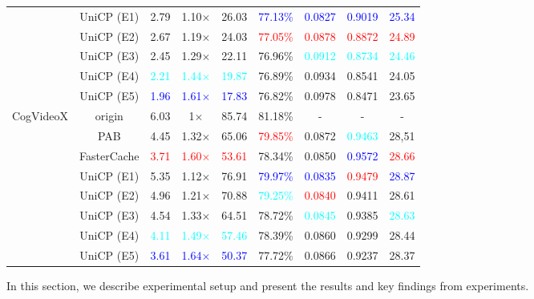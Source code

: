 \begin{table*}[ht]
\begin{tabular}{ccccccccc}
        \hline
        &UniCP (E1) & 2.79 & 1.10$\times$ & 26.03 & \textcolor{blue}{77.13\%} & \textcolor{blue}{0.0827} & \textcolor{blue}{0.9019} & \textcolor{blue}{25.34} \\
        &UniCP (E2) &2.67&1.19$\times$&24.03&\textcolor{red}{77.05\%} &\textcolor{red}{0.0878}&\textcolor{red}{0.8872}&\textcolor{red}{24.89}\\
        &UniCP (E3) &2.45&1.29$\times$&22.11&76.96\%&\textcolor{cyan}{0.0912}&\textcolor{cyan}{0.8734}&\textcolor{cyan}{24.46}\\
        &UniCP (E4) &\textcolor{cyan}{2.21}&\textcolor{cyan}{1.44$\times$}&\textcolor{cyan}{19.87}&76.89\%&0.0934&0.8541&24.05\\
        &UniCP (E5) & \textcolor{blue}{1.96} & \textcolor{blue}{1.61$\times$} & \textcolor{blue}{17.83} & 76.82\% & 0.0978 & 0.8471 & 23.65 \\
        \midrule
        \multirow{4}{*}{CogVideoX}
        & origin & 6.03 & 1$\times$ & 85.74 & 81.18\% & - & - & - \\ 
        & PAB \cite{zhao2024pab} & 4.45 & 1.32$\times$ & 65.06 & \textcolor{red}{79.85\%} & 0.0872 & \textcolor{cyan}{0.9463} & 28,51 \\
        & FasterCache \cite{lv2024fastercache} & \textcolor{red}{3.71} & \textcolor{red}{1.60$\times$} & \textcolor{red}{53.61} & 78.34\% & 0.0850 & \textcolor{blue}{0.9572} & \textcolor{red}{28.66} \\
        \hline
        &UniCP (E1) & 5.35 & 1.12$\times$ & 76.91&\textcolor{blue}{79.97\%} & \textcolor{blue}{0.0835} & \textcolor{red}{0.9479} & \textcolor{blue}{28.87} \\
        &UniCP (E2) &4.96&1.21$\times$&70.88&\textcolor{cyan}{79.25\%}&\textcolor{red}{0.0840}&0.9411&28.61\\
        &UniCP (E3) &4.54&1.33$\times$&64.51&78.72\%&\textcolor{cyan}{0.0845}&0.9385&\textcolor{cyan}{28.63}\\
        &UniCP (E4) &\textcolor{cyan}{4.11}&\textcolor{cyan}{1.49$\times$}&\textcolor{cyan}{57.46}&78.39\%&0.0860&0.9299&28.44\\
        &UniCP (E5) &\textcolor{blue}{3.61}&\textcolor{blue}{1.64$\times$}&\textcolor{blue}{50.37}&77.72\%&0.0866&0.9237&28.37\\
        
        \bottomrule
    \end{tabular}

\end{table*}
In this section, we describe experimental setup and present the results and key findings from experiments.
